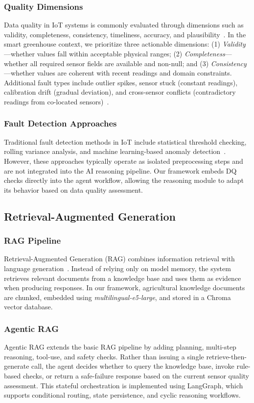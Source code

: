 \documentclass[runningheads]{llncs}
\begin{document}
\subsubsection{Quality Dimensions}
Data quality in IoT systems is commonly evaluated through dimensions such as validity, completeness, consistency, timeliness, accuracy, and plausibility~\cite{zhang2023dq}. In the smart greenhouse context, we prioritize three actionable dimensions: (1) \textit{Validity}---whether values fall within acceptable physical ranges; (2) \textit{Completeness}---whether all required sensor fields are available and non-null; and (3) \textit{Consistency}---whether values are coherent with recent readings and domain constraints. Additional fault types include outlier spikes, sensor stuck (constant readings), calibration drift (gradual deviation), and cross-sensor conflicts (contradictory readings from co-located sensors)~\cite{alomari2024multisensor}.

\subsubsection{Fault Detection Approaches}
Traditional fault detection methods in IoT include statistical threshold checking, rolling variance analysis, and machine learning-based anomaly detection~\cite{silva2024conflict}. However, these approaches typically operate as isolated preprocessing steps and are not integrated into the AI reasoning pipeline. Our framework embeds DQ checks directly into the agent workflow, allowing the reasoning module to adapt its behavior based on data quality assessment.

\subsection{Retrieval-Augmented Generation}
\subsubsection{RAG Pipeline}
Retrieval-Augmented Generation (RAG) combines information retrieval with language generation~\cite{lewis2020rag}. Instead of relying only on model memory, the system retrieves relevant documents from a knowledge base and uses them as evidence when producing responses. In our framework, agricultural knowledge documents are chunked, embedded using \textit{multilingual-e5-large}, and stored in a Chroma vector database.

\subsubsection{Agentic RAG}
Agentic RAG extends the basic RAG pipeline by adding planning, multi-step reasoning, tool-use, and safety checks. Rather than issuing a single retrieve-then-generate call, the agent decides whether to query the knowledge base, invoke rule-based checks, or return a safe-failure response based on the current sensor quality assessment. This stateful orchestration is implemented using LangGraph, which supports conditional routing, state persistence, and cyclic reasoning workflows.
\end{document}
